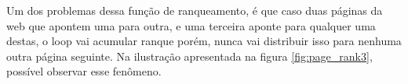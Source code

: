 Um dos problemas dessa função de ranqueamento, é que caso duas páginas da web que apontem uma para outra, e uma terceira aponte para qualquer uma destas, o loop vai acumular ranque porém, nunca vai distribuir isso para nenhuma outra página seguinte. Na ilustração apresentada na figura \ref{fig:page_rank3}, possível observar esse fenômeno.


